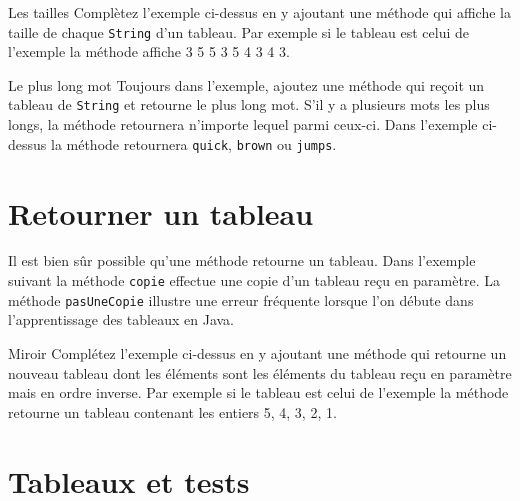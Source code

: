 \documentclass[a4paper,11pt]{article}
\begin{document}
	\begin{Exercice}{Les tailles}	
		Complètez l'exemple ci-dessus en y ajoutant une méthode 
			qui affiche la taille de chaque \texttt{String} d'un
			 tableau. Par exemple si le tableau est celui de l'exemple la méthode 		
			 affiche 3 5 5 3 5 4 3 4 3.
	\end{Exercice}
	
	\begin{Exercice}{Le plus long mot}
		Toujours dans l'exemple, ajoutez
		 une méthode  
			qui reçoit un tableau de \texttt{String} et retourne le 
			plus long mot. S'il y a plusieurs mots les plus longs, la méthode
			retournera n'importe lequel parmi ceux-ci. 
			Dans l'exemple ci-dessus la méthode retournera
			 \texttt{quick}, \texttt{brown} ou \texttt{jumps}.
				
	\end{Exercice}
	
	


\section{Retourner un tableau}

	Il est bien sûr possible qu'une méthode retourne un tableau.
	Dans l'exemple suivant la méthode \texttt{copie} 
	effectue une copie d'un tableau reçu en paramètre. 
	La méthode \texttt{pasUneCopie} illustre une erreur fréquente
	lorsque l'on débute dans l'apprentissage des tableaux en Java.
	

	\begin{Exercice}{Miroir}	
		Complétez l'exemple ci-dessus en y ajoutant une méthode 
			qui retourne un nouveau tableau dont les éléments sont les 
			éléments du tableau reçu en paramètre mais en ordre inverse. 
			Par exemple si le tableau est celui de l'exemple la méthode 		
			 retourne un tableau contenant les entiers 5, 4, 3, 2, 1.
	\end{Exercice}



\section{Tableaux et tests}
\end{document}
